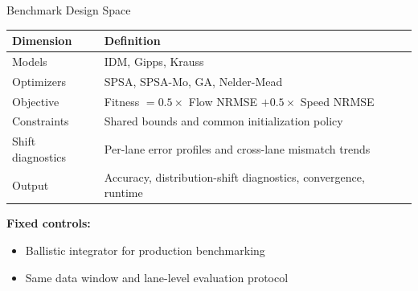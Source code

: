 \documentclass[aspectratio=169]{beamer}
\begin{document}
\begin{frame}{Benchmark Design Space}
    \begin{tabular}{l p{}}
        \toprule
        \textbf{Dimension} & \textbf{Definition} \\
        \midrule
        Models & IDM, Gipps, Krauss \\
        Optimizers & SPSA, SPSA-Mo, GA, Nelder-Mead \\
        Objective & Fitness \(= 0.5 \times\) Flow NRMSE \(+ 0.5 \times\) Speed NRMSE \\
        Constraints & Shared bounds and common initialization policy \\
        Shift diagnostics & Per-lane error profiles and cross-lane mismatch trends \\
        Output & Accuracy, distribution-shift diagnostics, convergence, runtime \\
        \bottomrule
    \end{tabular}

    \vspace{0.7em}
    \textbf{Fixed controls:}
    \begin{itemize}
        \item Ballistic integrator for production benchmarking
        \item Same data window and lane-level evaluation protocol
    \end{itemize}
\end{frame}
\end{document}
